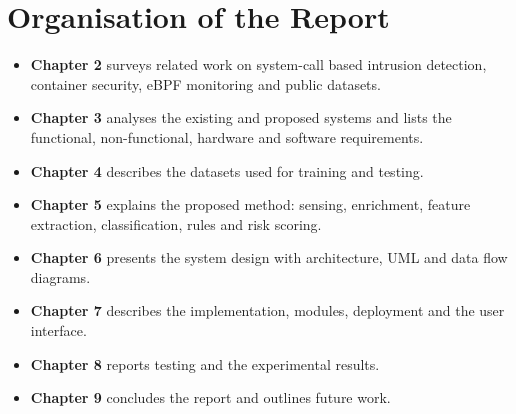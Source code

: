 \section{Organisation of the Report}

\begin{itemize}
    \item \textbf{Chapter 2} surveys related work on system-call based intrusion
          detection, container security, eBPF monitoring and public datasets.
    \item \textbf{Chapter 3} analyses the existing and proposed systems and lists the
          functional, non-functional, hardware and software requirements.
    \item \textbf{Chapter 4} describes the datasets used for training and testing.
    \item \textbf{Chapter 5} explains the proposed method: sensing, enrichment, feature
          extraction, classification, rules and risk scoring.
    \item \textbf{Chapter 6} presents the system design with architecture, UML and data
          flow diagrams.
    \item \textbf{Chapter 7} describes the implementation, modules, deployment and the
          user interface.
    \item \textbf{Chapter 8} reports testing and the experimental results.
    \item \textbf{Chapter 9} concludes the report and outlines future work.
\end{itemize}

